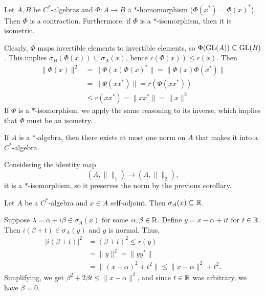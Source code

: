 \begin{corollary}\label{cor:2}
  Let $A, B$ be $C^*$-algebras and $\Phi: A \to B$ a $*$-homomorphism ($\Phi(x^*) = \Phi(x)^*$).
  Then $\Phi$ is a contraction. Furthermore, if $\Phi$ is a $*$-isomorphism,
  then it is isometric.
\end{corollary}

\begin{myproof}
  Clearly, $\Phi$ maps invertible elements to invertible elements,
  so $\Phi (\operatorname{GL} (A)) \subseteq \operatorname{GL} (B)$. This implies $\sigma_B (\Phi(x)) \subseteq \sigma_A (x)$,
  hence $r(\Phi(x)) \leq r(x)$. Then 
  \begin{align*}
    \| \Phi(x)\|^2 &= \| \Phi(x) \Phi(x)^*\| = \| \Phi(x) \Phi(x^*)\|\\
    &= \|\Phi(x x^*)\| = r(\Phi(x x^*))\\
    &\leq r(x x^*) = \| x x^*\| = \|x\|^2.
  \end{align*}
  If $\Phi$ is a $*$-isomorphism, we apply the same reasoning to its inverse, which implies that $\Phi$ must be an isometry.
\end{myproof}

\begin{corollary}
  If $A$ is a $*$-algebra, then there exists at most one norm on $A$
  that makes it into a $C^*$-algebra.
\end{corollary}

\begin{myproof}
  Considering the identity map 
  $$(A, \|\|_1) \rightarrow (A, \|\|_2),$$
  it is a $*$-isomorphism, so it preserves the norm by the previous corollary.
\end{myproof}

\begin{lemma}\label{lem:1}
  Let $A$ be a $C^*$-algebra and $x \in A$ self-adjoint. Then $\sigma_A (x) \subseteq \mathbb {R}$.
\end{lemma}

\begin{myproof}
  Suppose $\lambda = \alpha + i \beta \in \sigma_A (x)$ for some $\alpha, \beta \in \mathbb {R}$.
  Define $y = x - \alpha + it$ for $t \in \mathbb {R}$. Then $i(\beta + t) \in \sigma_A (y)$ and $y$ is normal.
  Thus, 
  \begin{align*}
    |i(\beta + t)|^2 &= (\beta + t)^2 \leq r(y)\\
    &= \|y\|^2 = \|yy^*\|\\
    &= \| (x - \alpha)^2 + t^2\| \leq \|x - \alpha\|^2 + t^2.
  \end{align*}
  Simplifying, we get $\beta^2 + 2 \beta t \leq \| x - \alpha\|^2$, and since $t \in \mathbb {R}$ was arbitrary, we have $\beta = 0$.
\end{myproof}

